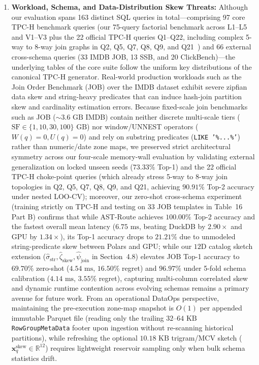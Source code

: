 \documentclass[10pt,a4paper]{article}
\begin{document}
\begin{enumerate}[leftmargin=1.5em,itemsep=2pt]
or general correlated-subquery engine; integrating native GPU SQL engines such as Sirius~\cite{yogatama2025sirius} or HeavyDB~\cite{root2019mapd} across broader hardware tiers is an important next step.
    \item \textbf{Workload, Schema, and Data-Distribution Skew Threats:} Although our evaluation spans 163 distinct SQL queries in total---comprising 97 core TPC-H benchmark queries (our 75-query factorial benchmark across L1--L5 and V1--V3 plus the 22 official TPC-H queries Q1--Q22, including complex 5-way to 8-way join graphs in Q2, Q5, Q7, Q8, Q9, and Q21~\cite{tpc2022tpch, dreseler2020quantifying}) and 66 external cross-schema queries (33 IMDB JOB, 13 SSB, and 20 ClickBench)---the underlying tables of the core suite follow the uniform key distributions of the canonical TPC-H generator. Real-world production workloads such as the Join Order Benchmark (JOB) \cite{leis2015job} over the IMDB dataset exhibit severe zipfian data skew and string-heavy predicates that can induce hash-join partition skew and cardinality estimation errors. Because fixed-scale join benchmarks such as JOB ($\sim 3.6\text{ GB}$ IMDB) contain neither discrete multi-scale tiers ($\text{SF} \in \{1, 10, 30, 100\}\text{ GB}$) nor window/UNNEST operators ($W(q)=0, U(q)=0$) and rely on substring predicates (\texttt{LIKE '\%...\%'}) rather than numeric/date zone maps, we preserved strict architectural symmetry across our four-scale memory-wall evaluation by validating external generalization on locked unseen seeds ($73.33\%$ Top-1) and the 22 official TPC-H choke-point queries (which already stress 5-way to 8-way join topologies in Q2, Q5, Q7, Q8, Q9, and Q21, achieving $90.91\%$ Top-2 accuracy under nested LOO-CV); moreover, our zero-shot cross-schema experiment (training strictly on TPC-H and testing on 33 JOB templates in Table~16 Part B) confirms that while AST-Route achieves $100.00\%$ Top-2 accuracy and the fastest overall mean latency ($6.75\text{ ms}$, beating DuckDB by $2.90\times$ and GPU by $1.34\times$), its Top-1 accuracy drops to $21.21\%$ due to unmodeled string-predicate skew between Polars and GPU; while our $12\text{D}$ catalog sketch extension ($\hat{\sigma}_{\text{str}}, \hat{\zeta}_{\text{skew}}, \hat{\psi}_{\text{join}}$ in Section~4.8) elevates JOB Top-1 accuracy to $69.70\%$ zero-shot ($4.54\text{ ms}$, $16.50\%$ regret) and $96.97\%$ under 5-fold schema calibration ($4.14\text{ ms}$, $3.55\%$ regret), capturing multi-column correlated skew and dynamic runtime contention across evolving schemas remains a primary avenue for future work. From an operational DataOps perspective, maintaining the pre-execution zone-map snapshot is $O(1)$ per appended immutable Parquet file (reading only the trailing $32$--$64\text{ KB}$ \texttt{RowGroupMetaData} footer upon ingestion without re-scanning historical partitions), while refreshing the optional $10.18\text{ KB}$ trigram/MCV sketch ($\mathbf{x}_q^{\text{skew}} \in \mathbb{R}^{12}$) requires lightweight reservoir sampling only when bulk schema statistics drift.

\end{enumerate}
\end{document}
